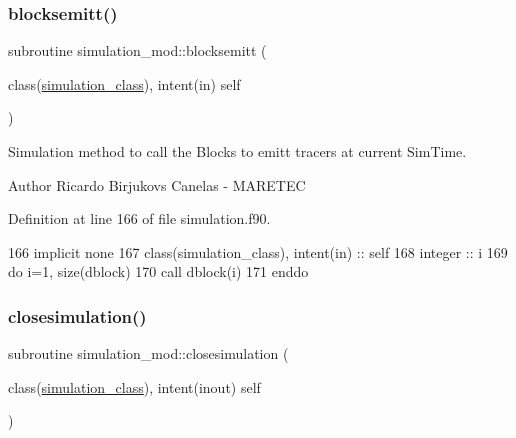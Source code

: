 \subsubsection{\texorpdfstring{blocksemitt()}{blocksemitt()}}
{\footnotesize\ttfamily subroutine simulation\+\_\+mod\+::blocksemitt (\begin{DoxyParamCaption}\item[{class(\mbox{\hyperlink{structsimulation__mod_1_1simulation__class}{simulation\+\_\+class}}), intent(in)}]{self }\end{DoxyParamCaption})\hspace{0.3cm}{\ttfamily [private]}}



Simulation method to call the Blocks to emitt tracers at current Sim\+Time. 

\begin{DoxyAuthor}{Author}
Ricardo Birjukovs Canelas -\/ M\+A\+R\+E\+T\+EC 
\end{DoxyAuthor}


Definition at line 166 of file simulation.\+f90.


\begin{DoxyCode}
166         \textcolor{keywordtype}{implicit none}
167         \textcolor{keywordtype}{class}(simulation\_class), \textcolor{keywordtype}{intent(in)} :: self
168         \textcolor{keywordtype}{integer} :: i
169         \textcolor{keywordflow}{do} i=1, \textcolor{keyword}{size}(dblock)
170             \textcolor{keyword}{call }dblock(i)%
171 \textcolor{keywordflow}{        enddo}        
\end{DoxyCode}
\mbox{\label{namespacesimulation__mod_a4285722eaa589fa671233554b54c74f8}} 
\subsubsection{\texorpdfstring{closesimulation()}{closesimulation()}}
{\footnotesize\ttfamily subroutine simulation\+\_\+mod\+::closesimulation (\begin{DoxyParamCaption}\item[{class(\mbox{\hyperlink{structsimulation__mod_1_1simulation__class}{simulation\+\_\+class}}), intent(inout)}]{self }\end{DoxyParamCaption})\hspace{0.3cm}{\ttfamily [private]}}




